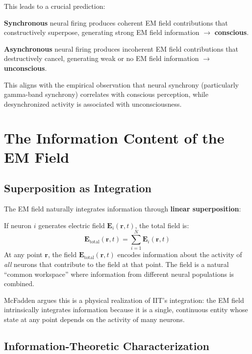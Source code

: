 \documentclass[11pt,a4paper]{report}
\begin{document}
This leads to a crucial prediction:

\begin{predbox}
\textbf{Synchronous} neural firing produces coherent EM field contributions that constructively superpose, generating strong EM field information $\to$ \textbf{conscious}.

\textbf{Asynchronous} neural firing produces incoherent EM field contributions that destructively cancel, generating weak or no EM field information $\to$ \textbf{unconscious}.

This aligns with the empirical observation that neural synchrony (particularly gamma-band synchrony) correlates with conscious perception, while desynchronized activity is associated with unconsciousness.
\end{predbox}

\section{The Information Content of the EM Field}

\subsection{Superposition as Integration}

The EM field naturally integrates information through \textbf{linear superposition}:

\begin{mathbox}
\vspace{-6pt}
If neuron $i$ generates electric field $\mathbf{E}_i(\mathbf{r}, t)$, the total field is:
\[
  \mathbf{E}_{\text{total}}(\mathbf{r}, t) = \sum_{i=1}^{N} \mathbf{E}_i(\mathbf{r}, t)
\]
At any point $\mathbf{r}$, the field $\mathbf{E}_{\text{total}}(\mathbf{r}, t)$ encodes information about the activity of \emph{all} neurons that contribute to the field at that point. The field is a natural ``common workspace'' where information from different neural populations is combined.
\vspace{-4pt}
\end{mathbox}

McFadden argues this is a physical realization of IIT's integration: the EM field intrinsically integrates information because it is a single, continuous entity whose state at any point depends on the activity of many neurons.

\subsection{Information-Theoretic Characterization}
\end{document}
